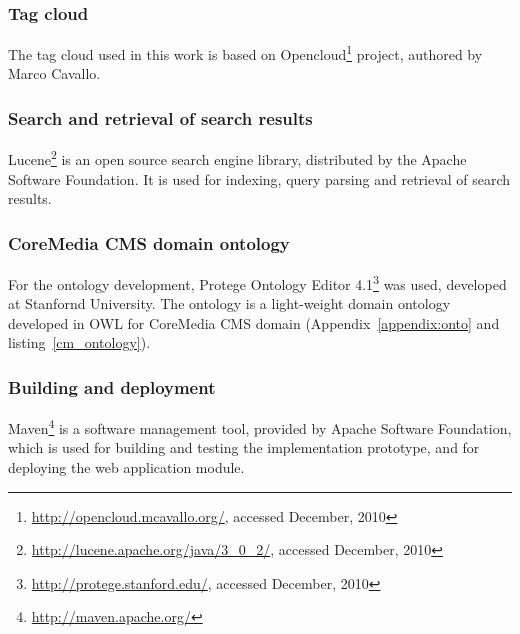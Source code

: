 \subsubsection{Tag cloud}
The tag cloud used in this work is based on Opencloud\footnote{\url{http://opencloud.mcavallo.org/}, accessed December, 2010} project, authored by Marco Cavallo.\\

\subsubsection{Search and retrieval of search results}
Lucene\footnote{\url{http://lucene.apache.org/java/3_0_2/}, accessed December, 2010} is an open source search engine library, distributed by the Apache Software Foundation. It is used for indexing, query parsing and retrieval of search results. \\

\subsubsection{CoreMedia CMS domain ontology}
For the ontology development, Protege Ontology Editor 4.1\footnote{\url{http://protege.stanford.edu/}, accessed December, 2010} was used, developed at Stanfornd University. The ontology is a light-weight domain ontology developed in OWL for CoreMedia \gls{CMS} domain (Appendix~\ref{appendix:onto} and listing~\ref{cm_ontology}). \\


\subsubsection{Building and deployment}
Maven\footnote{\url{http://maven.apache.org/}} is a software management tool, provided by Apache Software Foundation, which is used for building and testing the implementation prototype, and for deploying the web application module.


